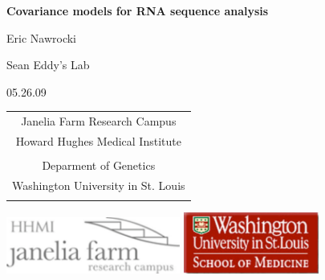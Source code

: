 \documentclass[landscape]{slides}
\begin{document}
\begin{slide}
\begin{center}
\large{\textbf{Covariance models for RNA sequence analysis}}
\normalsize

Eric Nawrocki

Sean Eddy's Lab

05.26.09

\medskip

\small

\begin{tabular}{c}
Janelia Farm Research Campus \\
Howard Hughes Medical Institute \\ 
\\
Deparment of Genetics \\
Washington University in St. Louis \\
\\
\end{tabular}

\includegraphics[width=2.25in]{figs/janelia}
\hspace{2in}
\includegraphics[width=1.75in]{figs/washu}


\end{center}
\end{slide}
\end{document}
